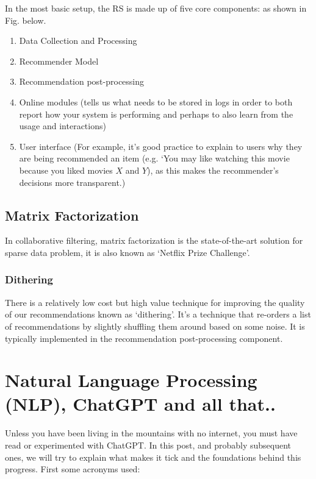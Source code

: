 \documentclass[11pt]{article}
\begin{document}
In the most basic setup, the RS is made up of five core components:
as shown in Fig. below. 

\begin{enumerate}
\item Data Collection and Processing 
\item Recommender Model
\item Recommendation post-processing
\item Online modules (tells us what needs to be stored in logs in order to both report how your system is performing and perhaps to also learn from the usage and interactions)
\item User interface (For example, it’s good practice to explain to users why they are being recommended an item (e.g. `You may like watching this movie because you liked movies $X$ and $Y$), as this makes the recommender’s decisions more transparent.)
\end{enumerate} 


\subsection{Matrix Factorization}

In collaborative filtering, matrix factorization is the state-of-the-art solution for sparse data problem, it is also known as `Netflix Prize Challenge'.


\subsubsection{Dithering}

There is a relatively low cost but high value technique for improving the quality of our 
recommendations known as `dithering'. It’s a technique that re-orders a list of recommendations by slightly shuffling them around based on some noise. 
It is typically implemented in the recommendation post-processing component.





\section{Natural Language Processing (NLP), ChatGPT and all that..}

Unless you have been living in the mountains with no internet, you must have read 
or experimented with ChatGPT. In this post, and probably subsequent ones, we will try to explain 
what makes it tick and the foundations behind this progress. First some acronyms used:
\end{document}
